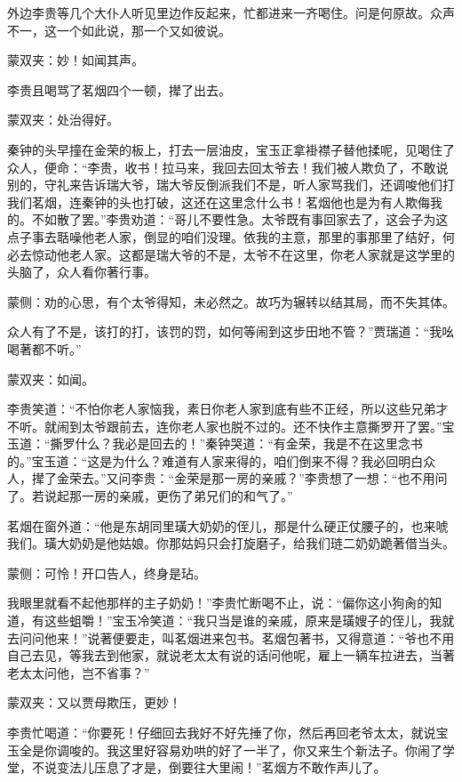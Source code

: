 \begin{parag}
    外边李贵等几个大仆人听见里边作反起来，忙都进来一齐喝住。问是何原故。众声不一，这一个如此说，那一个又如彼说。\begin{note}蒙双夹：妙！如闻其声。\end{note}李贵且喝骂了茗烟四个一顿，撵了出去。\begin{note}蒙双夹：处治得好。\end{note}秦钟的头早撞在金荣的板上，打去一层油皮，宝玉正拿褂襟子替他揉呢，见喝住了众人，便命：“李贵，收书！拉马来，我回去回太爷去！我们被人欺负了，不敢说别的，守礼来告诉瑞大爷，瑞大爷反倒派我们不是，听人家骂我们，还调唆他们打我们茗烟，连秦钟的头也打破，这还在这里念什么书！茗烟他也是为有人欺侮我的。不如散了罢。”李贵劝道：“哥儿不要性急。太爷既有事回家去了，这会子为这点子事去聒噪他老人家，倒显的咱们没理。依我的主意，那里的事那里了结好，何必去惊动他老人家。这都是瑞大爷的不是，太爷不在这里，你老人家就是这学里的头脑了，众人看你著行事。\begin{note}蒙侧：劝的心思，有个太爷得知，未必然之。故巧为辗转以结其局，而不失其体。\end{note}众人有了不是，该打的打，该罚的罚，如何等闹到这步田地不管？”贾瑞道：“我吆喝著都不听。”\begin{note}蒙双夹：如闻。\end{note}李贵笑道：“不怕你老人家恼我，素日你老人家到底有些不正经，所以这些兄弟才不听。就闹到太爷跟前去，连你老人家也脱不过的。还不快作主意撕罗开了罢。”宝玉道：“撕罗什么？我必是回去的！”秦钟哭道：“有金荣，我是不在这里念书的。”宝玉道：“这是为什么？难道有人家来得的，咱们倒来不得？我必回明白众人，撵了金荣去。”又问李贵：“金荣是那一房的亲戚？”李贵想了一想：“也不用问了。若说起那一房的亲戚，更伤了弟兄们的和气了。”
\end{parag}


\begin{parag}
    茗烟在窗外道：“他是东胡同里璜大奶奶的侄儿，那是什么硬正仗腰子的，也来唬我们。璜大奶奶是他姑娘。你那姑妈只会打旋磨子，给我们琏二奶奶跪著借当头。\begin{note}蒙侧：可怜！开口告人，终身是玷。\end{note}我眼里就看不起他那样的主子奶奶！”李贵忙断喝不止，说：“偏你这小狗肏的知道，有这些蛆嚼！”宝玉冷笑道：“我只当是谁的亲戚，原来是璜嫂子的侄儿，我就去问问他来！”说著便要走，叫茗烟进来包书。茗烟包著书，又得意道：“爷也不用自己去见，等我去到他家，就说老太太有说的话问他呢，雇上一辆车拉进去，当著老太太问他，岂不省事？”\begin{note}蒙双夹：又以贾母欺压，更妙！\end{note}李贵忙喝道：“你要死！仔细回去我好不好先捶了你，然后再回老爷太太，就说宝玉全是你调唆的。我这里好容易劝哄的好了一半了，你又来生个新法子。你闹了学堂，不说变法儿压息了才是，倒要往大里闹！”茗烟方不敢作声儿了。
\end{parag}


